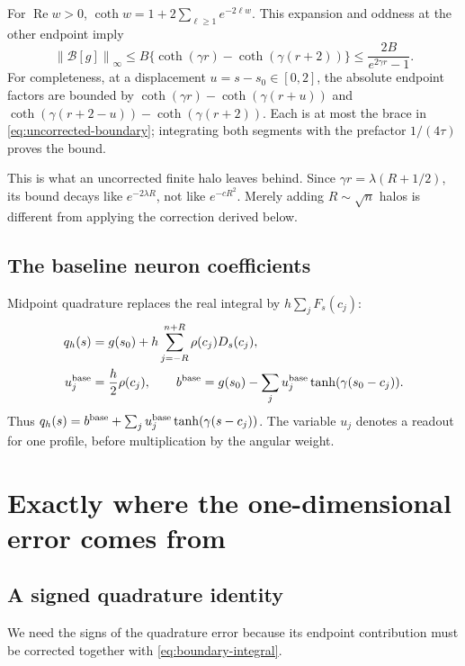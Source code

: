 \documentclass[11pt]{article}
\newcommand{\Real}{\operatorname{Re}}
\newcommand{\norm}[1]{\left\lVert#1\right\rVert}
\begin{document}
For $\Real w>0$, $\coth w=1+2\sum_{\ell\ge1}e^{-2\ell w}$. This expansion and oddness at the other endpoint imply
\begin{equation}
 \norm{\mathcal B[g]}_\infty
 \le B\{\coth(\gamma r)-\coth(\gamma(r+2))\}
 \le\frac{2B}{e^{2\gamma r}-1}.
 \label{eq:uncorrected-boundary}
\end{equation}
For completeness, at a displacement $u=s-s_0\in[0,2]$, the absolute endpoint factors are bounded by
$\coth(\gamma r)-\coth(\gamma(r+u))$ and
$\coth(\gamma(r+2-u))-\coth(\gamma(r+2))$. Each is at most the brace in \eqref{eq:uncorrected-boundary}; integrating both segments with the prefactor $1/(4\tau)$ proves the bound.

This is what an uncorrected finite halo leaves behind. Since $\gamma r=\lambda(R+1/2)$, its bound decays like $e^{-2\lambda R}$, not like $e^{-cR^2}$. Merely adding $R\sim\sqrt n$ halos is different from applying the correction derived below.

\subsection{The baseline neuron coefficients}

Midpoint quadrature replaces the real integral by $h\sum_j F_s(c_j)$:
\begin{align}
 q_h(s)&=g(s_0)+h\sum_{j=-R}^{n+R}\rho(c_j)D_s(c_j),\\
 u_j^{\rm base}&=\frac h2\rho(c_j),\qquad
 b^{\rm base}=g(s_0)-\sum_j u_j^{\rm base}\tanh(\gamma(s_0-c_j)).
 \label{eq:baseline}
\end{align}
Thus $q_h(s)=b^{\rm base}+\sum_j u_j^{\rm base}\tanh(\gamma(s-c_j))$. The variable $u_j$ denotes a readout for one profile, before multiplication by the angular weight.

\section{Exactly where the one-dimensional error comes from}
\subsection{A signed quadrature identity}

We need the signs of the quadrature error because its endpoint contribution must be corrected together with \eqref{eq:boundary-integral}.
\end{document}
